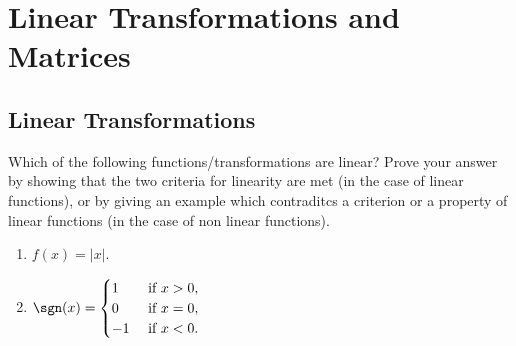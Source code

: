 \section{Linear Transformations and Matrices}

\subsection{Linear Transformations}
Which of the following functions/transformations are linear? Prove your answer by showing that the two criteria for linearity are met (in the case of linear functions), or by giving an example which contraditcs a criterion or a property of linear functions (in the case of non linear functions).
\begin{enumerate}
	\item $f(x) = |x|$.
		\if{}\fi
	
	\item $\sgn(x) = \begin{cases} 1 & \text{ if } x > 0,\\ 0 & \text{ if } x=0,\\ -1 & \text{ if } x<0.\end{cases}$
		\if{}\fi


\end{enumerate}
